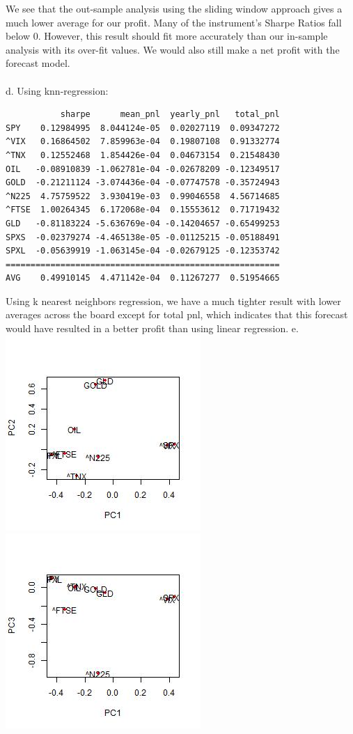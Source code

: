 \documentclass[12pt]{article}
\begin{document}
\hfill \break
We see that the out-sample analysis using the sliding window approach gives a much lower average for our profit. Many of the instrument's Sharpe Ratios fall below 0. However, this result should fit more accurately than our in-sample analysis with its over-fit values. We would also still make a net profit with the forecast model.
\\ \\
d. Using knn-regression:
\begin{lstlisting}
           sharpe      mean_pnl  yearly_pnl   total_pnl
SPY    0.12984995  8.044124e-05  0.02027119  0.09347272
^VIX   0.16864502  7.859963e-04  0.19807108  0.91332774
^TNX   0.12552468  1.854426e-04  0.04673154  0.21548430
OIL   -0.08910839 -1.062781e-04 -0.02678209 -0.12349517
GOLD  -0.21211124 -3.074436e-04 -0.07747578 -0.35724943
^N225  4.75759522  3.930419e-03  0.99046558  4.56714685
^FTSE  1.00264345  6.172068e-04  0.15553612  0.71719432
GLD   -0.81183224 -5.636769e-04 -0.14204657 -0.65499253
SPXS  -0.02379274 -4.465138e-05 -0.01125215 -0.05188491
SPXL  -0.05639919 -1.063145e-04 -0.02679125 -0.12353742
=======================================================
AVG    0.49910145  4.471142e-04  0.11267277  0.51954665
\end{lstlisting}
\hfill \break
Using k nearest neighbors regression, we have a much tighter result with lower averages across the board except for total pnl, which indicates that this forecast would have resulted in a better profit than using linear regression. 
\newpage
e. \\
\includegraphics{plots1.jpeg}
\includegraphics{plots2.jpeg} \\
\end{document}
